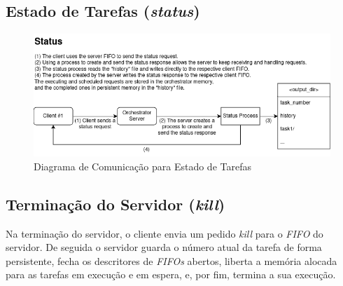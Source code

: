 \documentclass[a4paper,11pt]{scrreprt}
\begin{document}
        \subsection{Estado de Tarefas (\textit{status})}
            \begin{figure}[!ht]
                \centering
                \includegraphics[width=\textwidth]{diagrams/status.png}
                \caption{Diagrama de Comunicação para Estado de Tarefas}
                \label{fig:1.3}
            \end{figure}
        \subsection{Terminação do Servidor (\textit{kill})}
            Na terminação do servidor, o cliente envia um pedido \textit{kill} para o \textit{FIFO} do servidor.
            De seguida o servidor guarda o número atual da tarefa de forma persistente,
            fecha os descritores de \textit{FIFOs} abertos,
            liberta a memória alocada para as tarefas em execução e em espera, e, por fim, termina a
            sua execução.
\end{document}
